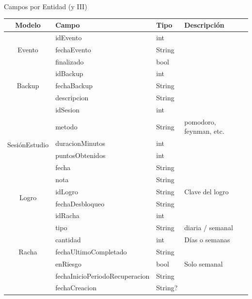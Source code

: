 \documentclass[11pt,landscape]{beamer}
\begin{document}
\begin{frame}{Campos por Entidad (y III)}
  \centering
  \begin{tabular}{clll}
    \toprule
    \rowcolor{black!45}
    \textbf{Modelo} & \textbf{Campo} & \textbf{Tipo} & \textbf{Descripción} \\
    \midrule
    \multirow{3}{*}{Evento} & idEvento & int & \\
     & fechaEvento & String & \\
     & finalizado & bool & \\
    \midrule
    \multirow{3}{*}{Backup} & idBackup & int & \\
     & fechaBackup & String & \\
     & descripcion & String & \\
    \midrule
    \multirow{6}{*}{SesiónEstudio} & idSesion & int & \\
     & metodo & String & pomodoro, feynman, etc. \\
     & duracionMinutos & int & \\
     & puntosObtenidos & int & \\
     & fecha & String & \\
     & nota & String & \\
    \midrule
    \multirow{2}{*}{Logro} & idLogro & String & Clave del logro \\
     & fechaDesbloqueo & String & \\
    \midrule
    \multirow{7}{*}{Racha} & idRacha & int & \\
     & tipo & String & diaria / semanal \\
     & cantidad & int & Días o semanas \\
     & fechaUltimoCompletado & String & \\
     & enRiesgo & bool & Solo semanal \\
     & fechaInicioPeriodoRecuperacion & String & \\
     & fechaCreacion & String? & \\
    \bottomrule
  \end{tabular}
\end{frame}
\end{document}
